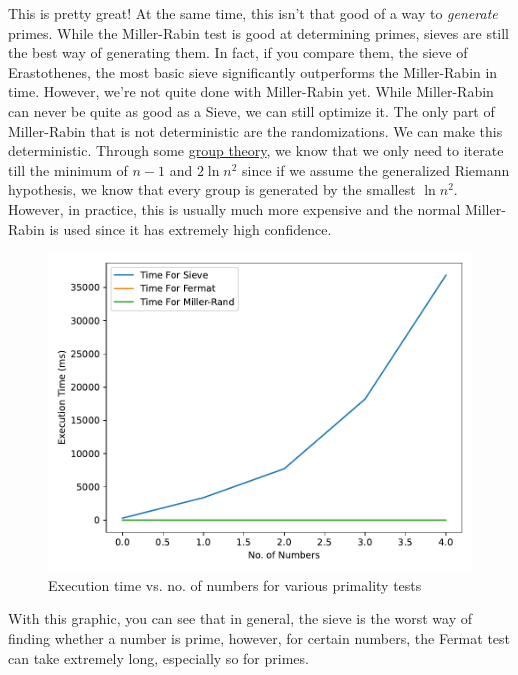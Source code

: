 \documentclass[conference]{IEEEtran}
\begin{document}
This is pretty great! At the same time, this isn't that good of a way to \textit{generate} primes. While the Miller-Rabin test is good at determining primes, sieves are still the best way of generating them. In fact, if you compare them, the sieve of Erastothenes, the most basic sieve significantly outperforms the Miller-Rabin in time. However, we're not quite done with Miller-Rabin yet. While Miller-Rabin can never be quite as good as a Sieve, we can still optimize it. The only part of Miller-Rabin that is not deterministic are the randomizations. We can make this deterministic. Through some \href{https://doi.org/10.1145%2F800116.803773}{group theory}, we know that we only need to iterate till the minimum of $n - 1$ and $2\ln{n}^2$ since if we assume the generalized Riemann hypothesis, we know that every group is generated by the smallest $\ln{n}^2$. However, in practice, this is usually much more expensive and the normal Miller-Rabin is used since it has extremely high confidence.

\begin{figure}[H]
  \centering
  \includegraphics[width=\linewidth,keepaspectratio]{Fermat-Sieve-MillerRand.pdf}
  \caption{Execution time vs. no. of numbers for various primality tests}
\end{figure}

With this graphic, you can see that in general, the sieve is the worst way of finding whether a number is prime, however, for certain numbers, the Fermat test can take extremely long, especially so for primes.
\end{document}
